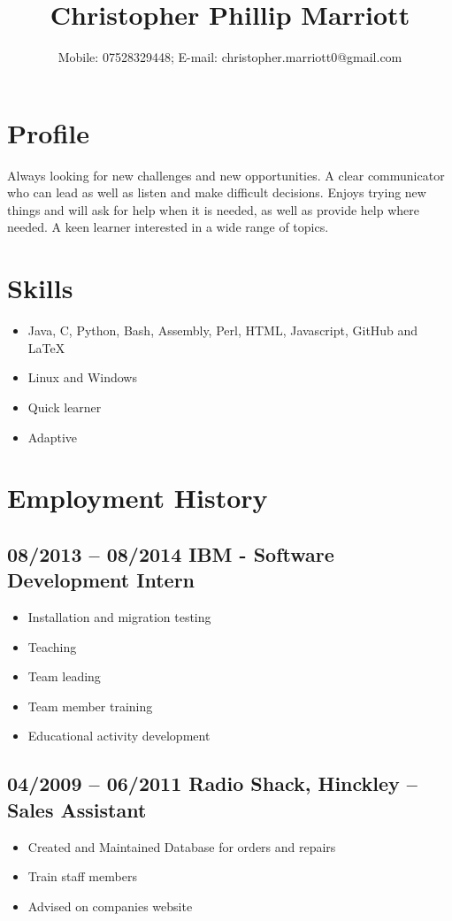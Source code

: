 \documentclass[0pt]{article}
\title{Christopher Phillip Marriott}
\date{Mobile: 07528329448; E-mail: christopher.marriott0@gmail.com}
\begin{document}
\maketitle
\thispagestyle{empty}
\pagestyle{empty}

\section*{Profile}
Always looking for new challenges and new opportunities. A clear communicator who can lead as well as listen and make difficult decisions. Enjoys trying new things and will ask for help when it is needed, as well as provide help where needed.  A keen learner interested in a wide range of topics.


\section*{Skills}
\begin{itemize}
	\item Java, C, Python, Bash, Assembly, Perl, HTML, Javascript, GitHub and LaTeX 
	\item Linux and Windows
	\item Quick learner
	\item Adaptive
\end{itemize}

\section*{Employment History}

\subsection*{08/2013 -- 08/2014   IBM - Software Development Intern}
\begin{itemize}
	\item Installation and migration testing
	\item Teaching
	\item Team leading
	\item Team member training 
	\item Educational activity development
\end{itemize}

\subsection*{04/2009 -- 06/2011   Radio Shack, Hinckley -- Sales Assistant}
\begin{itemize}
	\item Created and Maintained Database for orders and repairs
	\item Train staff members
	\item Advised on companies website
\end{itemize}
	
\end{document}
